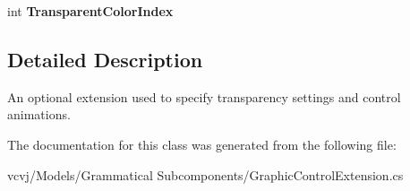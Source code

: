 \begin{DoxyCompactItemize}
\item 
int {\bfseries Transparent\+Color\+Index}\hypertarget{classvcvj_1_1_models_1_1_grammatical___subcomponents_1_1_graphic_control_extension_a5549c0c65d27e93cc9db2acb2b457f52}{}\label{classvcvj_1_1_models_1_1_grammatical___subcomponents_1_1_graphic_control_extension_a5549c0c65d27e93cc9db2acb2b457f52}

\end{DoxyCompactItemize}


\subsection{Detailed Description}
An optional extension used to specify transparency settings and control animations. 



The documentation for this class was generated from the following file\+:\begin{DoxyCompactItemize}
\item 
vcvj/\+Models/\+Grammatical Subcomponents/Graphic\+Control\+Extension.\+cs\end{DoxyCompactItemize}
